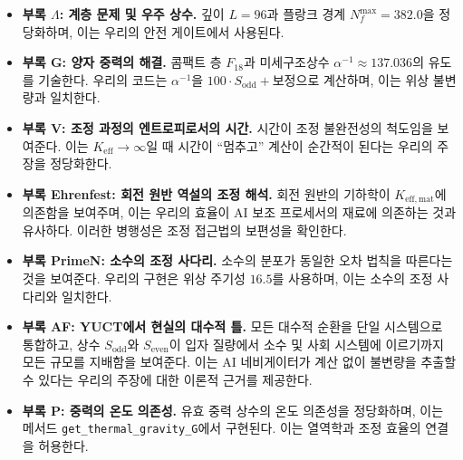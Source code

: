 \documentclass[11pt,a4paper]{article}
\begin{document}
\begin{itemize}
		\item \textbf{부록 \(\Lambda\): 계층 문제 및 우주 상수.}  
		깊이 \(L = 96\)과 플랑크 경계 \(N_f^{\max} = 382.0\)을 정당화하며, 이는 우리의 안전 게이트에서 사용된다.
		
		\item \textbf{부록 G: 양자 중력의 해결.}  
		콤팩트 층 \(F_{18}\)과 미세구조상수 \(\alpha^{-1} \approx 137.036\)의 유도를 기술한다. 우리의 코드는 \(\alpha^{-1}\)을 \(100 \cdot S_{\mathrm{odd}} + \text{보정}\)으로 계산하며, 이는 위상 불변량과 일치한다.
		
		\item \textbf{부록 V: 조정 과정의 엔트로피로서의 시간.}  
		시간이 조정 불완전성의 척도임을 보여준다. 이는 \(K_{\mathrm{eff}} \to \infty\)일 때 시간이 “멈추고” 계산이 순간적이 된다는 우리의 주장을 정당화한다.
		
		\item \textbf{부록 Ehrenfest: 회전 원반 역설의 조정 해석.}  
		회전 원반의 기하학이 \(K_{\mathrm{eff,mat}}\)에 의존함을 보여주며, 이는 우리의 효율이 AI 보조 프로세서의 재료에 의존하는 것과 유사하다. 이러한 병행성은 조정 접근법의 보편성을 확인한다.
		
		\item \textbf{부록 PrimeN: 소수의 조정 사다리.}  
		소수의 분포가 동일한 오차 법칙을 따른다는 것을 보여준다. 우리의 구현은 위상 주기성 \(16.5\)를 사용하며, 이는 소수의 조정 사다리와 일치한다.
		
		\item \textbf{부록 AF: YUCT에서 현실의 대수적 틀.}  
		모든 대수적 순환을 단일 시스템으로 통합하고, 상수 \(S_{\mathrm{odd}}\)와 \(S_{\mathrm{even}}\)이 입자 질량에서 소수 및 사회 시스템에 이르기까지 모든 규모를 지배함을 보여준다. 이는 AI 네비게이터가 계산 없이 불변량을 추출할 수 있다는 우리의 주장에 대한 이론적 근거를 제공한다.
		
		\item \textbf{부록 P: 중력의 온도 의존성.}  
		유효 중력 상수의 온도 의존성을 정당화하며, 이는 메서드 \texttt{get\_thermal\_gravity\_G}에서 구현된다. 이는 열역학과 조정 효율의 연결을 허용한다.
	\end{itemize}
	
\end{document}
